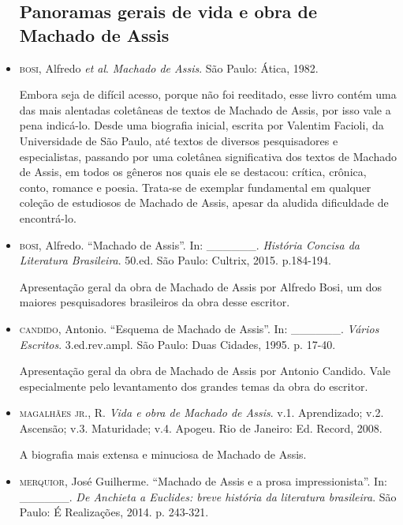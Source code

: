\documentclass[11pt]{extarticle}
\begin{document}
\begin{itemize}


\subsection{Panoramas gerais de vida e obra de Machado de Assis}

\item \textsc{bosi}, Alfredo \emph{et al}. \textit{Machado de Assis}. São Paulo: Ática,
1982.

Embora seja de difícil acesso, porque não foi reeditado, esse livro
contém uma das mais alentadas coletâneas de textos de Machado de Assis,
por isso vale a pena indicá-lo. Desde uma biografia inicial, escrita por
Valentim Facioli, da Universidade de São Paulo, até textos de diversos
pesquisadores e especialistas, passando por uma coletânea significativa
dos textos de Machado de Assis, em todos os gêneros nos quais ele se
destacou: crítica, crônica, conto, romance e poesia. Trata-se de
exemplar fundamental em qualquer coleção de estudiosos de Machado de
Assis, apesar da aludida dificuldade de encontrá-lo.

\item \textsc{bosi}, Alfredo. ``Machado de Assis''. In: \_\_\_\_\_\_. \textit{História
Concisa da Literatura Brasileira}. 50.ed. São Paulo: Cultrix, 2015.
p.184-194.

Apresentação geral da obra de Machado de Assis por Alfredo Bosi, um dos
maiores pesquisadores brasileiros da obra desse escritor.

\item \textsc{candido}, Antonio. ``Esquema de Machado de Assis''. In: \_\_\_\_\_\_.
\textit{Vários Escritos}. 3.ed.rev.ampl. São Paulo: Duas Cidades, 1995.
p. 17-40.

Apresentação geral da obra de Machado de Assis por Antonio Candido. Vale
especialmente pelo levantamento dos grandes temas da obra do escritor.

\item \textsc{magalhães jr}., R. \textit{Vida e obra de Machado de Assis}. v.1.
Aprendizado; v.2. Ascensão; v.3. Maturidade; v.4. Apogeu. Rio de
Janeiro: Ed. Record, 2008.

A biografia mais extensa e minuciosa de Machado de Assis.

\item \textsc{merquior}, José Guilherme. ``Machado de Assis e a prosa impressionista''.
In: \_\_\_\_\_\_. \textit{De Anchieta a Euclides: breve história da
literatura brasileira}. São Paulo: É Realizações, 2014. p. 243-321.


\end{itemize}
\end{document}
